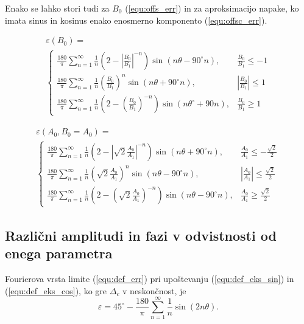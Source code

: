 \documentclass[a4paper]{article}
\begin{document}
Enako se lahko stori tudi za $B_0$ (\ref{equ:offs_err}) in za aproksimacijo napake, ko imata sinus in kosinus enako enosmerno komponento (\ref{equ:offsc_err}).

\begin{multline}
\label{equ:offs_err}
\varepsilon(B_0)=\\
\begin{cases}
\frac{180}{\pi}\sum_{n=1}^{\infty}\frac{1}{n}(2-|\frac{B_0}{B_1}|^{-n}) \sin (n \theta -  90^\circ n), & \frac{B_0}{B_1}\leq -1 \\
\frac{180}{\pi}\sum_{n=1}^{\infty}\frac{1}{n}(\frac{B_0}{B_1})^n \sin (n \theta + 90^\circ n), & |\frac{B_0}{B_1}|\leq 1 \\
\frac{180}{\pi}\sum_{n=1}^{\infty}\frac{1}{n}(2-(\frac{B_0}{B_1})^{-n}) \sin (n \theta^\circ + 90 n), & \frac{B_0}{B_1}\geq 1
\end{cases}
\end{multline}

\begin{multline}
\label{equ:offsc_err}
\varepsilon(A_0,B_0=A_0)=\\
\begin{cases}
\frac{180}{\pi}\sum_{n=1}^{\infty}\frac{1}{n}(2-|\sqrt{2}\frac{A_0}{A_1}|^{-n}) \sin (n \theta + 90^\circ n), & \frac{A_0}{A_1}\leq -\frac{\sqrt{2}}{2} \\
\frac{180}{\pi}\sum_{n=1}^{\infty}\frac{1}{n}(\sqrt{2}\frac{A_0}{A_1})^n \sin (n \theta - 90^\circ n), & |\frac{A_0}{A_1}|\leq \frac{\sqrt{2}}{2} \\
\frac{180}{\pi}\sum_{n=1}^{\infty}\frac{1}{n}(2-(\sqrt{2}\frac{A_0}{A_1})^{-n}) \sin (n \theta - 90^\circ n), & \frac{A_0}{A_1}\geq \frac{\sqrt{2}}{2}
\end{cases}
\end{multline}

\subsection{Različni amplitudi in fazi v odvistnosti od enega parametra}

Fourierova vrsta limite (\ref{equ:def_err}) pri upoštevanju (\ref{equ:def_eks_sin}) in (\ref{equ:def_eks_cos}), ko gre $\Delta_c$ v neskončnost, je
\begin{equation}
\label{equ:lim_dc_vrsta}
\varepsilon = 45^\circ -\frac{180}{\pi}\sum_{n=1}^{\infty}\frac{1}{n} \sin( 2 n \theta).
\end{equation}
\end{document}
